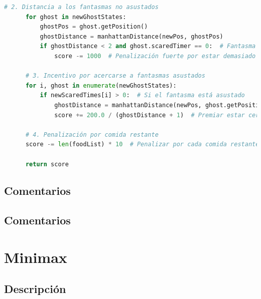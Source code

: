 \documentclass{report}
\begin{document}
\begin{lstlisting}[language=Python, caption=Implementación final del agente reflex]
      # 2. Distancia a los fantasmas no asustados
      for ghost in newGhostStates:
          ghostPos = ghost.getPosition()
          ghostDistance = manhattanDistance(newPos, ghostPos)
          if ghostDistance < 2 and ghost.scaredTimer == 0:  # Fantasma no asustado y muy cerca
              score -= 1000  # Penalización fuerte por estar demasiado cerca de un fantasma peligroso

      # 3. Incentivo por acercarse a fantasmas asustados
      for i, ghost in enumerate(newGhostStates):
          if newScaredTimes[i] > 0:  # Si el fantasma está asustado
              ghostDistance = manhattanDistance(newPos, ghost.getPosition())
              score += 200.0 / (ghostDistance + 1)  # Premiar estar cerca de un fantasma asustado

      # 4. Penalización por comida restante
      score -= len(foodList) * 10  # Penalizar por cada comida restante en el estado sucesor

      return score
          \end{lstlisting}
        \subsection{Comentarios}
          \paragraph*{}{

          }
        \subsection{Comentarios}
      \clearpage\section{Minimax}
        \subsection{Descripción}
\end{document}

